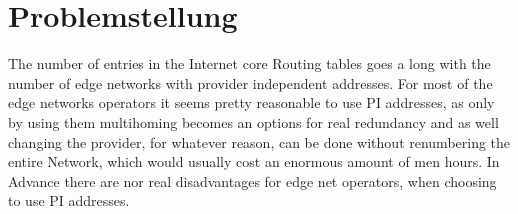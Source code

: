 \section{Problemstellung}
The number of entries in the Internet core Routing tables goes a long 
with the number of edge networks with provider independent addresses. 
For most of the edge networks operators it seems pretty reasonable to 
use PI addresses, as only by using them multihoming becomes an options for real 
redundancy and as well changing the provider, for whatever reason, 
can be done without renumbering the entire Network, which would usually 
cost an enormous amount of men hours. In Advance there are nor real 
disadvantages for edge net operators, when choosing to use PI 
addresses.  
